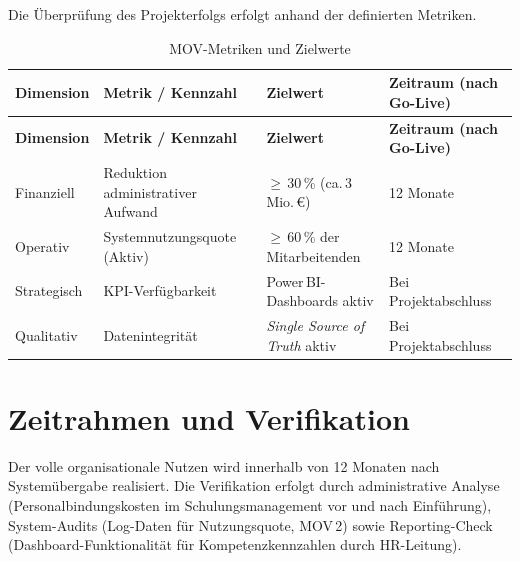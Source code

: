 Die Überprüfung des Projekterfolgs erfolgt anhand der definierten Metriken.

\begin{xltabular}{\textwidth}{@{}lXXX@{}}
    \caption{\ac{MOV}-Metriken und Zielwerte} \label{tab:mov-metriken} \\
    \hline
    \textbf{Dimension} & \textbf{Metrik / Kennzahl} & \textbf{Zielwert} & \textbf{Zeitraum (nach Go-Live)} \\
    \hline
    \endfirsthead

    \hline
    \textbf{Dimension} & \textbf{Metrik / Kennzahl} & \textbf{Zielwert} & \textbf{Zeitraum (nach Go-Live)} \\
    \hline
    \endhead

    \hline
    \endfoot

    Finanziell &
    Reduktion administrativer Aufwand &
    $\geq$\,30\,\% (ca.\,3\,Mio.\,€) &
    12 Monate \\

    Operativ &
    Systemnutzungsquote (Aktiv) &
    $\geq$\,60\,\% der Mitarbeitenden &
    12 Monate \\

    Strategisch &
    \ac{KPI}-Verfügbarkeit &
    Power\,BI-Dashboards aktiv &
    Bei Projektabschluss \\

    Qualitativ &
    Datenintegrität &
    \textit{Single Source of Truth} aktiv &
    Bei Projektabschluss \\

\end{xltabular}

\section{Zeitrahmen und Verifikation}
\label{sec:mov-verifikation}

Der volle organisationale Nutzen wird innerhalb von 12 Monaten nach
Systemübergabe realisiert. Die Verifikation erfolgt durch administrative
Analyse (Personalbindungskosten im Schulungsmanagement vor und nach
Einführung), System-Audits (Log-Daten für Nutzungsquote, \ac{MOV}\,2) sowie
Reporting-Check (Dashboard-Funktionalität für Kompetenzkennzahlen durch
\ac{HR}-Leitung).
